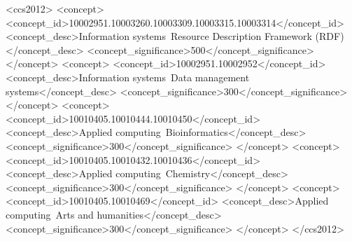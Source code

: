 \documentclass{sig-alternate-05-2015}
\begin{document}
%
%

\begin{CCSXML}
<ccs2012>
<concept>
<concept_id>10002951.10003260.10003309.10003315.10003314</concept_id>
<concept_desc>Information systems~Resource Description Framework (RDF)</concept_desc>
<concept_significance>500</concept_significance>
</concept>
<concept>
<concept_id>10002951.10002952</concept_id>
<concept_desc>Information systems~Data management systems</concept_desc>
<concept_significance>300</concept_significance>
</concept>
<concept>
<concept_id>10010405.10010444.10010450</concept_id>
<concept_desc>Applied computing~Bioinformatics</concept_desc>
<concept_significance>300</concept_significance>
</concept>
<concept>
<concept_id>10010405.10010432.10010436</concept_id>
<concept_desc>Applied computing~Chemistry</concept_desc>
<concept_significance>300</concept_significance>
</concept>
<concept>
<concept_id>10010405.10010469</concept_id>
<concept_desc>Applied computing~Arts and humanities</concept_desc>
<concept_significance>300</concept_significance>
</concept>
</ccs2012>
\end{CCSXML}


%
%

%
%
\printccsdesc





%

\printbibliography

% 

%
%
\end{document}

